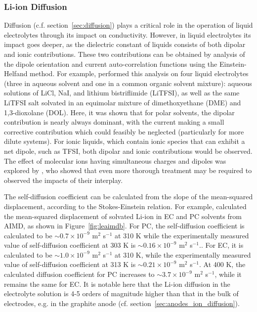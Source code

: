\documentclass[../main.tex]{subfiles}
\begin{document}
\subsubsection{Li-ion Diffusion}
Diffusion (c.f. section~\ref{sec:diffusion}) plays a critical role in the operation of liquid electrolytes through its impact on conductivity. However, in liquid electrolytes its impact goes deeper, as the dielectric constant of liquids consists of both dipolar and ionic contributions. These two contributions can be obtained by analysis of the dipole orientation and current auto-correlation functions using the Einstein-Helfand method. For example, \citeauthor{coles_correlation_2020} performed this analysis on four liquid electrolytes (three in aqueous solvent and one in a common organic solvent mixture): aqueous solutions of LiCl, NaI, and lithium bistriflimide (LiTFSI), as well as the same LiTFSI salt solvated in an equimolar mixture of dimethoxyethane (DME) and 1,3-dioxolane (DOL).\cite{coles_correlation_2020} Here, it was shown that for polar solvents, the dipolar contribution is nearly always dominant, with the current making a small corrective contribution which could feasibly be neglected (particularly for more dilute systems). For ionic liquids, which contain ionic species that can exhibit a net dipole, such as TFSI, both dipolar and ionic contributions would be observed. The effect of molecular ions having simultaneous charges and dipoles was explored by \citeauthor{schroder_collective_2011}, who showed that even more thorough treatment may be required to observed the impacts of their interplay.\cite{schroder_dielectric_2009}

The self-diffusion coefficient can be calculated from the slope of the mean-squared displacement, according to the Stokes-Einstein relation. For example, \citeauthor{Ganesh2011} calculated the mean-squared displacement of solvated Li-ion in EC and PC solvents from AIMD, as shown in Figure~\ref{fig:leaimdb}. For PC, the self-diffusion coefficient is calculated to be $\sim0.7\times10^{-9}$ m$^2$ s$^{-1}$ at 310 K while the experimentally measured value of self-diffusion coefficient at 303 K is $\sim0.16\times10^{-9}$ m$^2$ s$^{-1}$.\cite{Hayamizu1999}. For EC, it is calculated to be $\sim1.0\times10^{-9}$ m$^2$ s$^{-1}$ at 310 K, while the experimentally measured value of self-diffusion coefficient at 313 K is $\sim0.21\times10^{-9}$ m$^2$ s$^{-1}$.\cite{Hayamizu1999} At 400 K, the calculated diffusion coefficient for PC increases to $\sim3.7\times10^{-9}$ m$^2$ s$^{-1}$, while it remains the same for EC. It is notable here that the Li-ion diffusion in the electrolyte solution is 4-5 orders of magnitude higher than that in the bulk of electrodes, e.g. in the graphite anode (cf. section~\ref{sec:anodes_ion_diffusion}).
\end{document}
